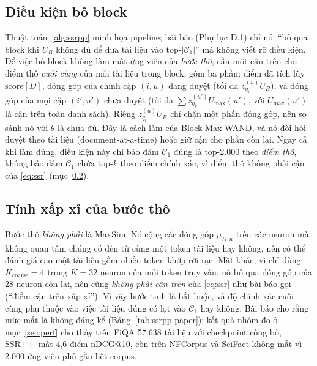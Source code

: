 \documentclass[a4paper,13pt]{extreport}
\makeatletter
\theoremstyle{plain}
\newcommand{\ssrpp}{SSR++}
\newcommand{\ndcg}{nDCG@10}
\makeatother
\begin{document}
\subsection{Điều kiện bỏ block}
\label{sec:prune-bound}
Thuật toán~\ref{alg:ssrpp} minh họa pipeline; bài báo (Phụ lục D.1) chỉ nói ``bỏ qua block khi $U_B$ không đủ để đưa tài liệu vào top-$|\mathcal{C}_1|$'' mà không viết rõ điều kiện. Để việc bỏ block không làm mất ứng viên của \emph{bước thô}, cần một cận trên cho điểm thô \emph{cuối cùng} của mỗi tài liệu trong block, gồm ba phần: điểm đã tích lũy $\mathrm{score}[D]$, đóng góp của chính cặp $(i,u)$ đang duyệt (tối đa $z_{q_i}^{(u)}U_B$), và đóng góp của mọi cặp $(i',u')$ chưa duyệt (tối đa $\sum z_{q_{i'}}^{(u')}U_{\max}(u')$, với $U_{\max}(u')$ là cận trên toàn danh sách). Riêng $z_{q_i}^{(u)}U_B$ chỉ chặn một phần đóng góp, nên so sánh nó với $\theta$ là chưa đủ. Đây là cách làm của Block-Max WAND, và nó đòi hỏi duyệt theo tài liệu (document-at-a-time) hoặc giữ cận cho phần còn lại. Ngay cả khi làm đúng, điều kiện này chỉ bảo đảm $\mathcal{C}_1$ đúng là top-2.000 theo \emph{điểm thô}, không bảo đảm $\mathcal{C}_1$ chứa top-$k$ theo điểm chính xác, vì điểm thô không phải cận của \eqref{eq:ssr} (mục~\ref{sec:coarse-approx}).

\subsection{Tính xấp xỉ của bước thô}
\label{sec:coarse-approx}
Bước thô \emph{không phải} là MaxSim. Nó cộng các đóng góp $\mu_{D,u}$ trên các neuron mà không quan tâm chúng có đến từ cùng một token tài liệu hay không, nên có thể đánh giá cao một tài liệu gồm nhiều token khớp rời rạc. Mặt khác, vì chỉ dùng $K_{\mathrm{coarse}}=4$ trong $K=32$ neuron của mỗi token truy vấn, nó bỏ qua đóng góp của 28 neuron còn lại, nên cũng \emph{không phải cận trên} của \eqref{eq:ssr} như bài báo gọi (``điểm cận trên xấp xỉ''). Vì vậy bước tinh là bắt buộc, và độ chính xác cuối cùng phụ thuộc vào việc tài liệu đúng có lọt vào $\mathcal{C}_1$ hay không. Bài báo cho rằng mức mất là không đáng kể (Bảng~\ref{tab:ssrpp-paper}); kết quả nhóm đo ở mục~\ref{sec:perf} cho thấy trên FiQA 57.638 tài liệu với checkpoint công bố, \ssrpp\ mất 4,6 điểm \ndcg, còn trên NFCorpus và SciFact không mất vì 2.000 ứng viên phủ gần hết corpus.
\end{document}
